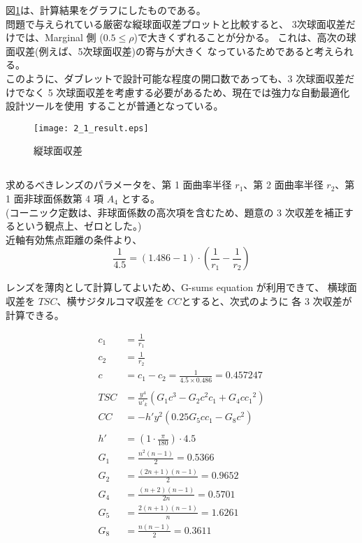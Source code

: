 \documentclass[a4paper,10pt]{jsarticle}
\begin{document}
図\ref{LSA}は、計算結果をグラフにしたものである。\\
問題で与えられている厳密な縦球面収差プロットと比較すると、
3次球面収差だけでは、Marginal 側 ($ 0.5 \le \rho$)で大きくずれることが分かる。
これは、高次の球面収差(例えば、5次球面収差)の寄与が大きく
なっているためであると考えられる。\\
このように、ダブレットで設計可能な程度の開口数であっても、3 次球面収差だけでなく
5 次球面収差を考慮する必要があるため、現在では強力な自動最適化設計ツールを使用
することが普通となっている。

\begin{center}
\begin{figure}
\texttt{[image: 2\_1\_result.eps]}
\caption{縦球面収差}
\label{LSA}
\end{figure}
\end{center}

\newpage

\subsection{}
求めるべきレンズのパラメータを、第 1 面曲率半径 $r_1$、第 2 面曲率半径 $r_2$、第 1 面非球面係数第 4 項 $A_4$
とする。\\
(コーニック定数は、非球面係数の高次項を含むため、題意の 3 次収差を補正するという観点上、ゼロとした。)\\
近軸有効焦点距離の条件より、
\begin{equation*}
\frac{1}{4.5} = (1.486-1) \cdot (\frac{1}{r_1}-\frac{1}{r_2})
\end{equation*}

レンズを薄肉として計算してよいため、G-sums equation が利用できて、
横球面収差を $TSC$、横サジタルコマ収差を $CC$とすると、次式のように
各 3 次収差が計算できる。


\begin{align*}
c_1 &= \frac{1}{r_1} \\
c_2 &= \frac{1}{r_2} \\
c &= c_1 - c_2 = \frac{1}{4.5 \times 0.486} = 0.457247 \\
\\
TSC &= \frac{y^4}{u'_k} (G_1 c^3 - G_2 c^2 c_1 + G_4 c {c_1}^2) \\
CC &= -h' y^2 (0.25 G_5 c c_1 - G_8 c^2) \\
\\
h' &= (1 \cdot \frac{\pi}{180}) \cdot 4.5 \\
G_1 &= \frac{n^2(n-1)}{2} = 0.5366 \\
G_2 &= \frac{(2n+1)(n-1)}{2} = 0.9652 \\
G_4 &= \frac{(n+2)(n-1)}{2n} = 0.5701 \\
G_5 &= \frac{2(n+1)(n-1)}{n} = 1.6261 \\
G_8 &= \frac{n(n-1)}{2} = 0.3611
\end{align*}
\end{document}
